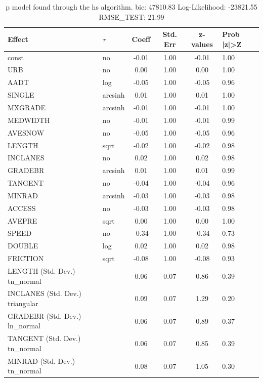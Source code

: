 \begin{table}
	\caption{p model found through the hs algorithm. bic: 47810.83 Log-Likelihood: -23821.55 RMSE_TEST: 21.99}
	\begin{center}
		\begin{tabular}{|l|l|c|c|c|l|}
			\hline
			Effect & $\tau$ & Coeff & Std. Err & z-values & Prob |z|>Z \\
			\hline
			const & no & -0.01 & 1.00 & -0.01 & 1.00 \\
			\hline
			URB & no & 0.00 & 1.00 & 0.00 & 1.00 \\
			\hline
			AADT & log & -0.05 & 1.00 & -0.05 & 0.96 \\
			\hline
			SINGLE & arcsinh & 0.01 & 1.00 & 0.01 & 1.00 \\
			\hline
			MXGRADE & arcsinh & -0.01 & 1.00 & -0.01 & 1.00 \\
			\hline
			MEDWIDTH & no & -0.01 & 1.00 & -0.01 & 0.99 \\
			\hline
			AVESNOW & no & -0.05 & 1.00 & -0.05 & 0.96 \\
			\hline
			LENGTH & sqrt & -0.02 & 1.00 & -0.02 & 0.98 \\
			\hline
			INCLANES & no & 0.02 & 1.00 & 0.02 & 0.98 \\
			\hline
			GRADEBR & arcsinh & 0.01 & 1.00 & 0.01 & 0.99 \\
			\hline
			TANGENT & no & -0.04 & 1.00 & -0.04 & 0.96 \\
			\hline
			MINRAD & arcsinh & -0.03 & 1.00 & -0.03 & 0.98 \\
			\hline
			ACCESS & no & -0.03 & 1.00 & -0.03 & 0.98 \\
			\hline
			AVEPRE & sqrt & 0.00 & 1.00 & 0.00 & 1.00 \\
			\hline
			SPEED & no & -0.34 & 1.00 & -0.34 & 0.73 \\
			\hline
			DOUBLE & log & 0.02 & 1.00 & 0.02 & 0.98 \\
			\hline
			FRICTION & sqrt & -0.08 & 1.00 & -0.08 & 0.93 \\
			\hline
			LENGTH (Std. Dev.) tn_normal &  & 0.06 & 0.07 & 0.86 & 0.39 \\
			\hline
			INCLANES (Std. Dev.) triangular &  & 0.09 & 0.07 & 1.29 & 0.20 \\
			\hline
			GRADEBR (Std. Dev.) ln_normal &  & 0.06 & 0.07 & 0.89 & 0.37 \\
			\hline
			TANGENT (Std. Dev.) tn_normal &  & 0.06 & 0.07 & 0.85 & 0.39 \\
			\hline
			MINRAD (Std. Dev.) tn_normal &  & 0.08 & 0.07 & 1.05 & 0.30 \\

\end{tabular}
\end{center}
\end{table}
